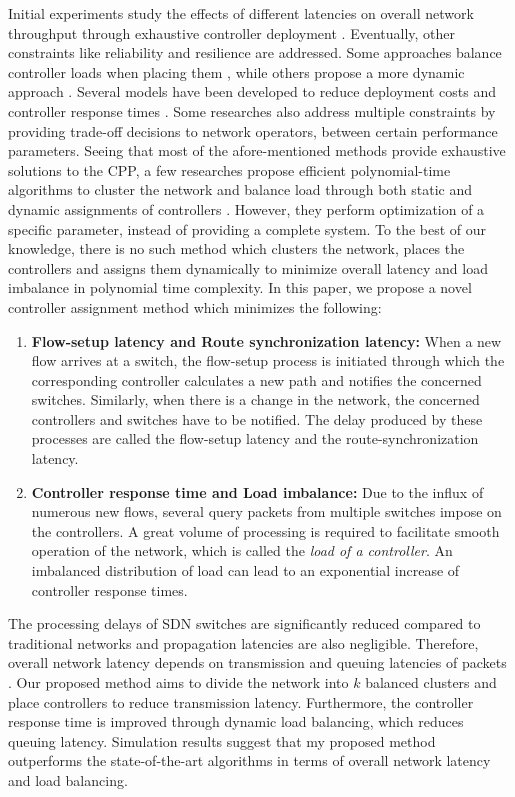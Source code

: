 \documentclass[preprint,12pt]{elsarticle}
\begin{document}
	Initial experiments study the effects of different latencies on overall network throughput through exhaustive controller deployment \cite{cpp2012heller}. Eventually, other constraints like reliability \cite{hu2013reliability} and resilience \cite{zhang2011resilience} are addressed. Some approaches balance controller loads when placing them \cite{yao2014capacitated}, while others propose a more dynamic approach \cite{yao2015controller}. Several models have been developed to reduce deployment costs \cite{sallahi2015optimal} and controller response times \cite{wang2016dynamic}. Some researches also address multiple constraints by providing trade-off decisions to network operators, between certain performance parameters. Seeing that most of the afore-mentioned methods provide exhaustive solutions to the CPP, a few researches propose efficient polynomial-time algorithms to cluster the network \cite{dbcp2017} and balance load through both static \cite{dbcp2017} and dynamic assignments of controllers \cite{filali2018sdn}. However, they perform optimization of a specific parameter, instead of providing a complete system. To the best of our knowledge, there is no such method which clusters the network, places the controllers and assigns them dynamically to minimize overall latency and load imbalance in polynomial time complexity. In this paper, we propose a novel controller assignment method which minimizes the following:
	\begin{enumerate}
		\item \textbf{Flow-setup latency and Route synchronization latency:} When a new flow arrives at a switch, the flow-setup process is initiated through which the corresponding controller calculates a new path and notifies the concerned switches. Similarly, when there is a change in the network, the concerned controllers and switches have to be notified. The delay produced by these processes are called the flow-setup latency and the route-synchronization latency.
		\item \textbf{Controller response time and Load imbalance:} Due to the influx of numerous new flows, several query packets from multiple switches impose on the controllers. A great volume of processing is required to facilitate smooth operation of the network, which is called the \textit{load of a controller}. An imbalanced distribution of load can lead to an exponential increase of controller response times.
	\end{enumerate}
	The processing delays of SDN switches are significantly reduced compared to traditional networks and propagation latencies are also negligible. Therefore, overall network latency depends on transmission and queuing latencies of packets \cite{forouzan2006data}. Our proposed method aims to divide the network into $k$ balanced clusters and place controllers to reduce transmission latency. Furthermore, the controller response time is improved through dynamic load balancing, which reduces queuing latency. Simulation results suggest that my proposed method outperforms the state-of-the-art algorithms in terms of overall network latency and load balancing.
	
\end{document}
